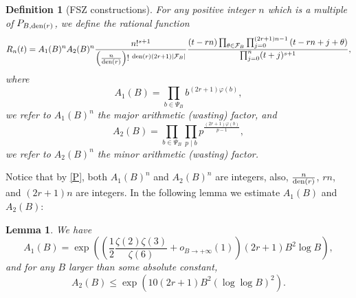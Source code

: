 \documentclass[11pt]{amsart}
\newtheorem{lemma}[theorem]{Lemma}
\newtheorem{definition}[theorem]{Definition}
\numberwithin{equation}{section}
\begin{document}
\smallskip
\begin{definition}[FSZ constructions]\label{auxiliary_function}
For any positive integer $n$ which is a multiple of $P_{B,{\rm den}(r)}$, we define the rational function
\[R_n(t) = A_1(B)^n A_2(B)^n \frac{n!^{s+1}}{\left( \frac{n}{{\rm den}(r)} \right)!~^{{\rm den}(r)(2r+1)|\mathcal{F}_B|}} \frac{(t-rn)\prod_{\theta \in \mathcal{F}_{B}} \prod_{j=0}^{(2r+1)n-1} \left(  t-rn+j+\theta \right) }{\prod_{j=0}^{n}(t+j)^{s+1}},\]
where
\[ A_1(B) = \prod_{b \in \mathcal{\varPsi}_B} b^{(2r+1)\varphi(b)}, \]
we refer to $A_1(B)^n$ the \emph{major arithmetic (wasting) factor}, and
\[ A_2(B) = \prod_{b \in \mathcal{\varPsi}_B} \prod_{p \mid b} p^{\frac{(2r+1)\varphi(b)}{p-1}} ,\]
we refer to $A_2(B)^n$ the \emph{minor arithmetic (wasting) factor}.
\end{definition}
\smallskip

Notice that by \eqref{P}, both $A_1(B)^n$ and $A_2(B)^n$ are integers, also, $\frac{n}{{\rm den}(r)}$, $rn$, and $(2r+1)n$ are integers. In the following lemma we estimate $A_1(B)$ and $A_2(B)$:

\smallskip
\begin{lemma}\label{A1A2}
We have
\[ A_1(B) = \exp\left( \left( \frac{1}{2} \frac{\zeta(2)\zeta(3)}{\zeta(6)} + o_{B \rightarrow + \infty}(1) \right)\left(2r+1\right) B^2 \log B \right), \]
and for any $B$ larger than some absolute constant,
\[ A_2(B) \leqslant \exp\left( 10(2r+1)B^2(\log\log B)^2 \right) .\]
\end{lemma}
\end{document}
